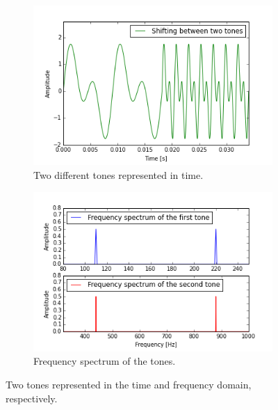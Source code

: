 \begin{figure}[H]
	\centering
	\begin{subfigure}{0.49\textwidth}
		\centering
		\includegraphics[width = \textwidth]{figures/sine_time_STFT.png}
		\caption{Two different tones represented in time.}
		\label{fig:sine_time_STFT}
	\end{subfigure}
	\begin{subfigure}{0.49\textwidth}
	\centering
		\includegraphics[width = \textwidth]{figures/sine_freq_STFT.png}
		\caption{Frequency spectrum of the tones.}
		\label{fig:sine_freq_STFT}
	\end{subfigure}
	\caption{Two tones represented in the time and frequency domain, respectively.}
	\label{fig:sine_STFT}
\end{figure}

